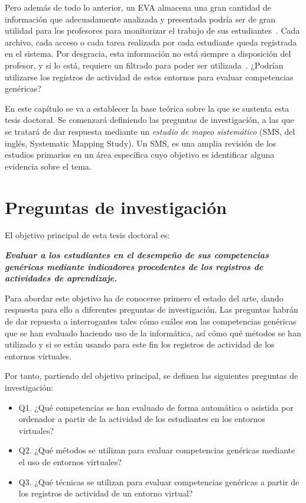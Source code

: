 Pero además de todo lo anterior, un EVA almacena una gran cantidad de información que adecuadamente analizada y presentada podría ser de gran utilidad para los profesores para monitorizar el trabajo de sus estudiantes~\cite{podgorelec:2011}. Cada archivo, cada acceso o cada tarea realizada por cada estudiante queda registrada en el sistema. Por desgracia, esta información no está siempre a disposición del profesor, y si lo está, requiere un filtrado para poder ser utilizada~\cite{Chebil:2012}. ¿Podrían utilizarse los registros de actividad de estos entornos para evaluar competencias genéricas?

En este capítulo se va a establecer la base teórica sobre la que se sustenta esta tesis doctoral. Se comenzará definiendo las preguntas de investigación, a las que se tratará de dar respuesta mediante un \emph{estudio de mapeo sistemático} (SMS, del inglés, Systematic Mapping Study). Un SMS, es una amplia revisión de los estudios primarios en un área específica cuyo objetivo es identificar alguna evidencia sobre el tema.

\section{Preguntas de investigación}

El objetivo principal de esta tesis doctoral es:

\bigskip
\textbf{\emph{Evaluar a los estudiantes en el desempeño de sus competencias genéricas mediante indicadores procedentes de los registros de actividades de aprendizaje.}}
\bigskip

Para abordar este objetivo ha de conocerse primero el estado del arte, dando respuesta para ello a diferentes preguntas de investigación. Las preguntas habrán de dar repuesta a interrogantes tales cómo cuáles son las competencias genéricas que se han evaluado haciendo uso de la informática, así cómo qué métodos se han utilizado y si se están usando para este fin los registros de actividad de los entornos virtuales.

\bigskip
Por tanto, partiendo del objetivo principal, se definen las siguientes preguntas de investigación:
\begin{itemize}
\item Q1. ¿Qué competencias se han evaluado de forma automática o asistida por ordenador a partir de la actividad de los estudiantes en los entornos virtuales?
\item Q2. ¿Qué métodos se utilizan para evaluar competencias genéricas mediante el uso de entornos virtuales?
\item Q3. ¿Qué técnicas se utilizan para evaluar competencias genéricas a partir de los registros de actividad de un entorno virtual?
\end{itemize}


